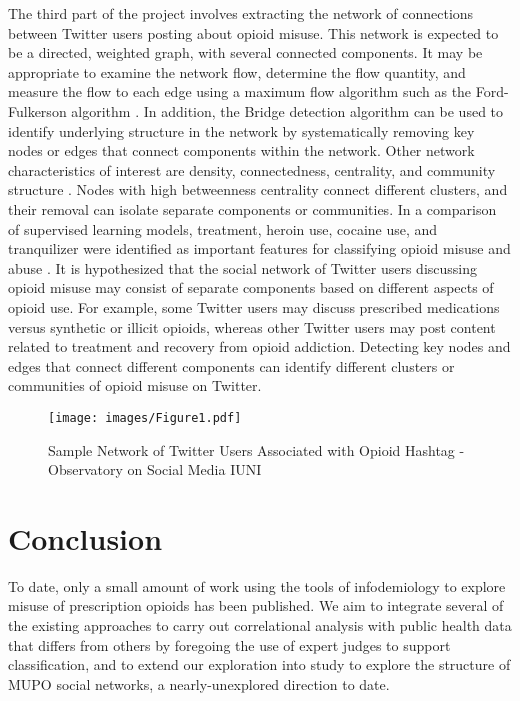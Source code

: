 \documentclass[sigconf]{acmart}
\begin{document}
The third part of the project involves extracting the network of connections 
between Twitter users posting about opioid misuse. This network is expected to 
be a directed, weighted graph, with several connected components. It may be 
appropriate to examine the network flow, determine the flow quantity, and 
measure the flow to each edge using a maximum flow algorithm such as the Ford-
Fulkerson algorithm \cite{zafarani14}. In addition, the Bridge detection 
algorithm can be used to identify underlying structure in the network by 
systematically removing key nodes or edges that connect components within the 
network. Other network characteristics of interest are density, connectedness, 
centrality, and community structure \cite{golbeck13}. Nodes with high 
betweenness centrality connect different clusters, and their removal can
isolate separate components or communities. In a comparison of supervised 
learning models, treatment, heroin use, cocaine use, and tranquilizer were 
identified as important features for classifying opioid misuse and abuse 
\cite{shiverick17}. It is hypothesized that the social network of Twitter 
users discussing opioid misuse may consist of separate components based on 
different aspects of opioid use. For example, some Twitter users may discuss 
prescribed medications versus synthetic or illicit opioids, whereas other 
Twitter users may post content related to treatment and recovery from opioid 
addiction. Detecting key nodes and edges that connect different components 
can identify different clusters or communities of opioid misuse on Twitter.

\begin{figure}[!ht]
  \centering\texttt{[image: images/Figure1.pdf]}
  \caption{Sample Network of Twitter Users Associated with Opioid Hashtag - 
  Observatory on Social Media IUNI}
  \label{f:Figure1}
\end{figure}

\section{Conclusion}

To date, only a small amount of work using the tools of infodemiology to 
explore misuse of prescription opioids has been published. We aim to integrate 
several of the existing approaches to carry out correlational analysis with 
public health data that differs from others by foregoing the use of expert 
judges to support classification, and to extend our exploration into study to 
explore the structure of MUPO social networks, a nearly-unexplored direction 
to date. 
\end{document}

